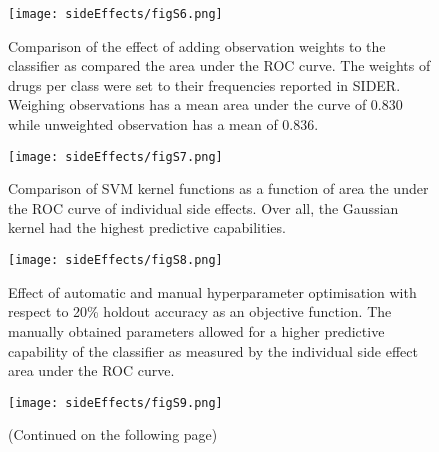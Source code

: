 \clearpage
\begin{figure}[!htp]
\centering
	\texttt{[image: sideEffects/figS6.png]}%
	\caption[Effect of observation weight.]{Comparison of the effect of adding observation weights to the classifier as compared the area under the ROC curve. The weights of drugs per class were set to their frequencies reported in SIDER. Weighing observations has a mean area under the curve of 0.830 while unweighted observation has a mean of 0.836.}
	\label{fig:s6seff}
\end{figure}

\clearpage
\begin{figure}[!htp]
\centering
	\texttt{[image: sideEffects/figS7.png]}%
	\caption[Comparison of SVM kernel functions.]{Comparison of SVM kernel functions as a function of area the under the ROC curve of individual side effects. Over all, the Gaussian kernel had the highest predictive capabilities.}
	\label{fig:s7seff}
\end{figure}

\clearpage
\begin{figure}[!htp]
\centering
	\texttt{[image: sideEffects/figS8.png]}%
	\caption[Automatic tuning of kernel parameters.]{Effect of automatic and manual hyperparameter optimisation with respect to 20\% holdout accuracy as an objective function. The manually obtained parameters allowed for a higher predictive capability of the classifier as measured by the individual side effect area under the ROC curve.}
	\label{fig:s8seff}
\end{figure}

\clearpage
\begin{figure}[!htp]
\centering
	\texttt{[image: sideEffects/figS9.png]}%
	\caption[Drug cluster validation and characteristics]{(Continued on the following page)}
	\label{fig:s9seff}
\end{figure}
\begin{figure}[t]
\end{figure}

